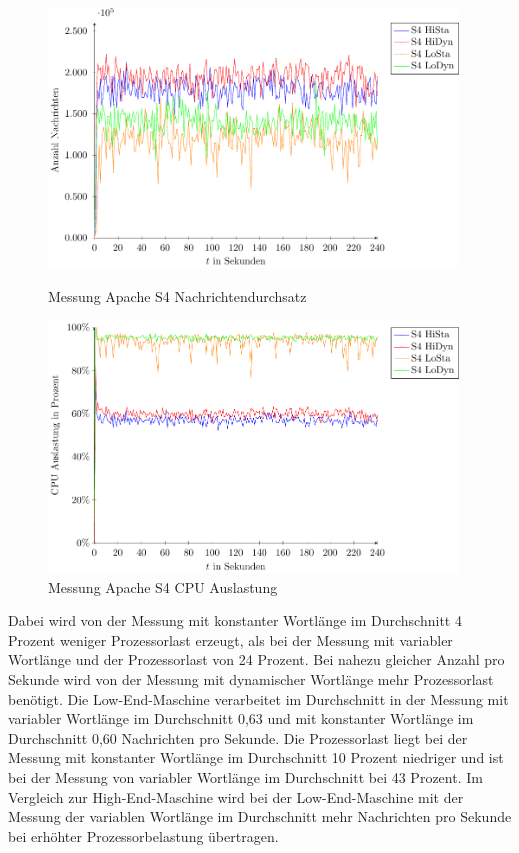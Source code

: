 \begin{figure}[!ht]
\includegraphics[width=0.97\textwidth]{plots/messungS4Durchsatz.pdf}
\caption{Messung Apache S4 Nachrichtendurchsatz
\label{fig:messungS4Nd}}
\includegraphics[width=0.97\textwidth]{plots/messungS4Cpu.pdf}
\caption{Messung Apache S4 CPU Auslastung
\label{fig:messungS4Cpu}}
\end{figure}

Dabei wird von der Messung mit konstanter Wortlänge im Durchschnitt 4 Prozent weniger Prozessorlast erzeugt, als bei der Messung mit variabler Wortlänge und der Prozessorlast von 24 Prozent. Bei nahezu gleicher Anzahl pro Sekunde wird von der Messung mit dynamischer Wortlänge mehr Prozessorlast benötigt. Die Low-End-Maschine verarbeitet im Durchschnitt in der Messung mit variabler Wortlänge im Durchschnitt 0,63 und mit konstanter Wortlänge im Durchschnitt 0,60 Nachrichten pro Sekunde. Die Prozessorlast liegt bei der Messung mit konstanter Wortlänge im Durchschnitt 10 Prozent niedriger und ist bei der Messung von variabler Wortlänge im Durchschnitt bei 43 Prozent. Im Vergleich zur High-End-Maschine wird bei der Low-End-Maschine mit der Messung der variablen Wortlänge im Durchschnitt mehr Nachrichten pro Sekunde bei erhöhter Prozessorbelastung übertragen.


